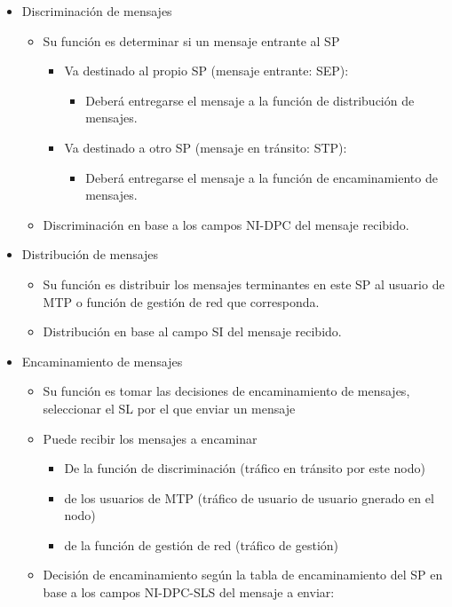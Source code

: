 \documentclass[10pt,portrait, twocolumn]{article}
\begin{document}
	\begin{itemize}
	\item Discriminación de mensajes
		\begin{itemize}
		\item Su función es determinar si un mensaje entrante al SP
			\begin{itemize}
			\item Va destinado al propio SP (mensaje entrante: SEP):
				\begin{itemize}
				\item Deberá entregarse el mensaje a la función de distribución de mensajes.
				\end{itemize}
			\item Va destinado a otro SP (mensaje en tránsito: STP):
				\begin{itemize}
				\item Deberá entregarse el mensaje a la función de encaminamiento de mensajes.
				\end{itemize}
			\end{itemize}
		\item Discriminación en base a los campos NI-DPC del mensaje recibido.
		\end{itemize}	
	\item Distribución de mensajes
		\begin{itemize}
		\item Su función es distribuir los mensajes terminantes en este SP al usuario de MTP o función de gestión de red que corresponda.
		\item Distribución en base al campo SI del mensaje recibido.
		\end{itemize} 
	\item Encaminamiento de mensajes
		\begin{itemize}
		\item Su función es tomar las decisiones de encaminamiento de mensajes, seleccionar el SL por el que enviar un mensaje
		\item Puede recibir los mensajes a encaminar
			\begin{itemize}
			\item De la función de discriminación (tráfico en tránsito por este nodo)
			\item de los usuarios de MTP (tráfico de usuario de usuario gnerado en el nodo)
			\item de la función de gestión de red (tráfico de gestión)
			\end{itemize}
		\item Decisión de encaminamiento según la tabla de encaminamiento del SP en base a los campos NI-DPC-SLS del mensaje a enviar:

\end{itemize}
\end{itemize}
\end{document}
